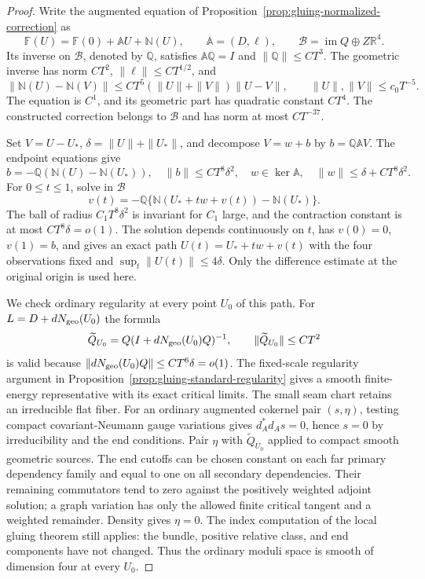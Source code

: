 \documentclass[11pt]{amsart}
\theoremstyle{definition}
\theoremstyle{remark}
\theoremstyle{plain}
\newcommand{\RR}{\mathbb{R}}
\begin{document}
\begin{proof}
Write the augmented equation of
Proposition~\ref{prop:gluing-normalized-correction} as
\[
 \mathbb F(U)=\mathbb F(0)+\mathbb A U+\mathbb N(U),\qquad
 \mathbb A=(D,\ell),\qquad
 \mathcal B=\operatorname{im}Q\oplus Z\RR^4 .
\]
Its inverse on $\mathcal B$, denoted by $\mathbb Q$, satisfies
$\mathbb A\mathbb Q=I$ and $\|\mathbb Q\|\leq CT^3$.
The geometric inverse has norm $CT^2$,
$\|\ell\|\leq CT^{1/2}$, and
\begin{equation}\label{eq:converse-full-difference}
 \|\mathbb N(U)-\mathbb N(V)\|
 \leq CT^5(\|U\|+\|V\|)\|U-V\|,
       \qquad \|U\|,\|V\|\leq c_0T^{-5}.
\end{equation}
The equation is $C^1$, and its geometric part has quadratic
constant $CT^4$. The constructed correction belongs to
$\mathcal B$ and has norm at most $CT^{-37}$.

Set $V=U-U_*$, $\delta=\|U\|+\|U_*\|$, and decompose
$V=w+b$ by $b=\mathbb Q\mathbb A V$.
The endpoint equations give
\[
 b=-\mathbb Q(\mathbb N(U)-\mathbb N(U_*)),\quad
 \|b\|\leq CT^8\delta^2,\quad
 w\in\ker\mathbb A,\quad
 \|w\|\leq\delta+CT^8\delta^2 .
\]
For $0\leq t\leq1$, solve in $\mathcal B$
\begin{equation}\label{eq:converse-exact-path}
 v(t)=-\mathbb Q\{\mathbb N(U_*+tw+v(t))-\mathbb N(U_*)\}.
\end{equation}
The ball of radius $C_1T^8\delta^2$ is invariant for $C_1$
large, and the contraction constant is at most $CT^8\delta=o(1)$.
The solution depends continuously on $t$, has $v(0)=0$,
$v(1)=b$, and gives an exact path
$U(t)=U_*+tw+v(t)$ with the four observations fixed and
$\sup_t\|U(t)\|\leq4\delta$.
Only the difference estimate at the original origin is used here.

We check ordinary regularity at every point $U_0$ of this path.
For $L=D+dN_{\rm geo}(U_0)$ the formula
\[
 \widetilde Q_{U_0}=Q(I+dN_{\rm geo}(U_0)Q)^{-1},
          \qquad \|\widetilde Q_{U_0}\|\leq CT^2
\]
is valid because $\|dN_{\rm geo}(U_0)Q\|\leq CT^6\delta=o(1)$.
The fixed-scale regularity argument in
Proposition~\ref{prop:gluing-standard-regularity} gives a smooth
finite-energy representative with its exact critical limits.
The small seam chart retains an irreducible flat fiber.
For an ordinary augmented cokernel pair $(s,\eta)$, testing
compact covariant-Neumann gauge variations gives
$d_A^*d_As=0$, hence $s=0$ by irreducibility and the end
conditions. Pair $\eta$ with $\widetilde Q_{U_0}$ applied to
compact smooth geometric sources. The end cutoffs can be chosen
constant on each far primary dependency family and equal to one
on all secondary dependencies. Their remaining commutators tend
to zero against the positively weighted adjoint solution; a
graph variation has only the allowed finite critical tangent
and a weighted remainder. Density gives $\eta=0$.
The index computation of the local gluing theorem still applies:
the bundle, positive relative class, and end components have
not changed. Thus the ordinary moduli space is smooth of
dimension four at every $U_0$.


\end{proof}
\end{document}
